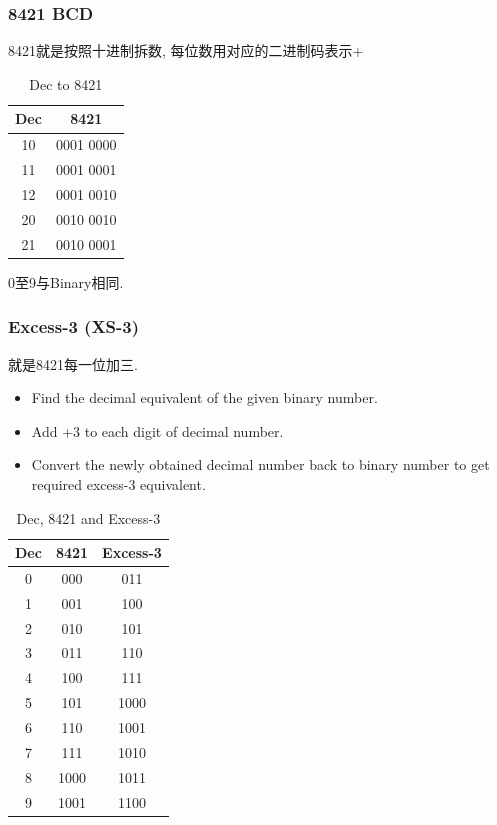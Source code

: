 \documentclass[scheme=chinese,a4paper]{report}
\begin{document}
\subsubsection{8421 BCD}
8421就是按照十进制拆数, 每位数用对应的二进制码表示+\par

\begin{table}[htb]
    \centering
    \caption{Dec to 8421}
    \begin{tabular}{c c}
        Dec & 8421 \\
        \hline
        10 & 0001 0000\\
        11 & 0001 0001\\
        12 & 0001 0010\\
        20 & 0010 0010\\
        21 & 0010 0001\\
    \end{tabular}
\end{table}
0至9与Binary相同. 

\subsubsection{Excess-3 (XS-3)}
就是8421每一位加三. 
\begin{itemize}
    \item Find the decimal equivalent of the given binary number.
    \item Add +3 to each digit of decimal number.
    \item Convert the newly obtained decimal number back to binary number to get required excess-3 equivalent.
\end{itemize}

\begin{table}[htb]
    \centering
    \caption{Dec, 8421 and Excess-3}
      \begin{tabular}{c c c}
        Dec& 8421 & Excess-3\\
        \hline
      0     & 000     & 011 \\

      1     & 001     & 100 \\

      2     & 010    & 101 \\

      3     & 011    & 110 \\

      4     & 100   & 111 \\

      5     & 101   & 1000 \\

      6     & 110   & 1001 \\

      7     & 111   & 1010 \\

      8     & 1000  & 1011 \\

      9     & 1001  & 1100 \\
      \end{tabular}%
  \end{table}%
  
\end{document}
